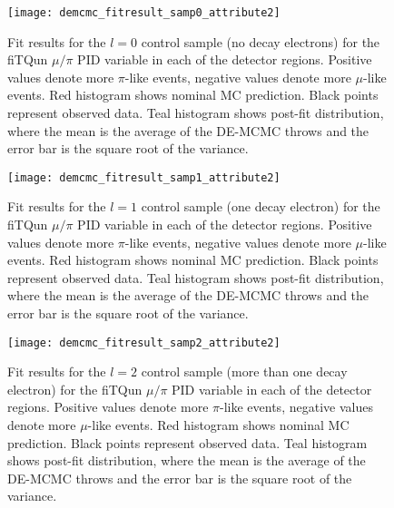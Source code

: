 \begin{figure}[h]
  \begin{center}
    \texttt{[image: demcmc\_fitresult\_samp0\_attribute2]} 
  \end{center}
  \caption{Fit results for the $l=0$ control sample (no decay electrons) for
  the fiTQun $\mu/\pi$ PID variable in each of the detector regions. Positive
  values denote more $\pi$-like events, negative values denote more $\mu$-like
  events. Red histogram shows nominal MC prediction.  Black points represent
  observed data.  Teal histogram shows post-fit distribution, where the mean is
  the average of the DE-MCMC throws and the error bar is the square root of the
  variance.}
  \label{fig:fitresults_samp0_att2}
\end{figure}


\begin{figure}[h]
  \begin{center}
    \texttt{[image: demcmc\_fitresult\_samp1\_attribute2]} 
  \end{center}
  \caption{Fit results for the $l=1$ control sample (one decay electron) for
  the fiTQun $\mu/\pi$ PID variable in each of the detector regions.  Positive
  values denote more $\pi$-like events, negative values denote more $\mu$-like
  events. Red histogram shows nominal MC prediction.  Black points represent
  observed data.  Teal histogram shows post-fit distribution, where the mean is
  the average of the DE-MCMC throws and the error bar is the square root of the
  variance.} 
  \label{fig:fitresults_samp1_att2}
\end{figure}


\begin{figure}[h]
  \begin{center}
    \texttt{[image: demcmc\_fitresult\_samp2\_attribute2]} 
  \end{center}
  \caption{Fit results for the $l=2$ control sample (more than one decay
  electron) for the fiTQun $\mu/\pi$ PID variable in each of the detector
  regions.  Positive values denote more $\pi$-like events, negative values
  denote more $\mu$-like events. Red histogram shows nominal MC prediction.
  Black points represent observed data.  Teal histogram shows post-fit
  distribution, where the mean is the average of the DE-MCMC throws and the
  error bar is the square root of the variance.}
  \label{fig:fitresults_samp2_att2}
\end{figure}


